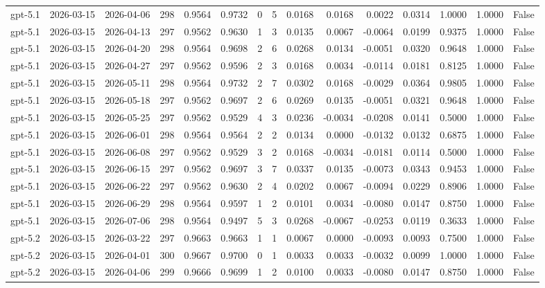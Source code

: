 \begin{table}
\begin{tabular}{lllrrrrrrrrrrrr}
gpt-5.1 & 2026-03-15 & 2026-04-06 & 298 & 0.9564 & 0.9732 & 0 & 5 & 0.0168 & 0.0168 & 0.0022 & 0.0314 & 1.0000 & 1.0000 & False \\
gpt-5.1 & 2026-03-15 & 2026-04-13 & 297 & 0.9562 & 0.9630 & 1 & 3 & 0.0135 & 0.0067 & -0.0064 & 0.0199 & 0.9375 & 1.0000 & False \\
gpt-5.1 & 2026-03-15 & 2026-04-20 & 298 & 0.9564 & 0.9698 & 2 & 6 & 0.0268 & 0.0134 & -0.0051 & 0.0320 & 0.9648 & 1.0000 & False \\
gpt-5.1 & 2026-03-15 & 2026-04-27 & 297 & 0.9562 & 0.9596 & 2 & 3 & 0.0168 & 0.0034 & -0.0114 & 0.0181 & 0.8125 & 1.0000 & False \\
gpt-5.1 & 2026-03-15 & 2026-05-11 & 298 & 0.9564 & 0.9732 & 2 & 7 & 0.0302 & 0.0168 & -0.0029 & 0.0364 & 0.9805 & 1.0000 & False \\
gpt-5.1 & 2026-03-15 & 2026-05-18 & 297 & 0.9562 & 0.9697 & 2 & 6 & 0.0269 & 0.0135 & -0.0051 & 0.0321 & 0.9648 & 1.0000 & False \\
gpt-5.1 & 2026-03-15 & 2026-05-25 & 297 & 0.9562 & 0.9529 & 4 & 3 & 0.0236 & -0.0034 & -0.0208 & 0.0141 & 0.5000 & 1.0000 & False \\
gpt-5.1 & 2026-03-15 & 2026-06-01 & 298 & 0.9564 & 0.9564 & 2 & 2 & 0.0134 & 0.0000 & -0.0132 & 0.0132 & 0.6875 & 1.0000 & False \\
gpt-5.1 & 2026-03-15 & 2026-06-08 & 297 & 0.9562 & 0.9529 & 3 & 2 & 0.0168 & -0.0034 & -0.0181 & 0.0114 & 0.5000 & 1.0000 & False \\
gpt-5.1 & 2026-03-15 & 2026-06-15 & 297 & 0.9562 & 0.9697 & 3 & 7 & 0.0337 & 0.0135 & -0.0073 & 0.0343 & 0.9453 & 1.0000 & False \\
gpt-5.1 & 2026-03-15 & 2026-06-22 & 297 & 0.9562 & 0.9630 & 2 & 4 & 0.0202 & 0.0067 & -0.0094 & 0.0229 & 0.8906 & 1.0000 & False \\
gpt-5.1 & 2026-03-15 & 2026-06-29 & 298 & 0.9564 & 0.9597 & 1 & 2 & 0.0101 & 0.0034 & -0.0080 & 0.0147 & 0.8750 & 1.0000 & False \\
gpt-5.1 & 2026-03-15 & 2026-07-06 & 298 & 0.9564 & 0.9497 & 5 & 3 & 0.0268 & -0.0067 & -0.0253 & 0.0119 & 0.3633 & 1.0000 & False \\
gpt-5.2 & 2026-03-15 & 2026-03-22 & 297 & 0.9663 & 0.9663 & 1 & 1 & 0.0067 & 0.0000 & -0.0093 & 0.0093 & 0.7500 & 1.0000 & False \\
gpt-5.2 & 2026-03-15 & 2026-04-01 & 300 & 0.9667 & 0.9700 & 0 & 1 & 0.0033 & 0.0033 & -0.0032 & 0.0099 & 1.0000 & 1.0000 & False \\
gpt-5.2 & 2026-03-15 & 2026-04-06 & 299 & 0.9666 & 0.9699 & 1 & 2 & 0.0100 & 0.0033 & -0.0080 & 0.0147 & 0.8750 & 1.0000 & False \\

\end{tabular}
\end{table}
